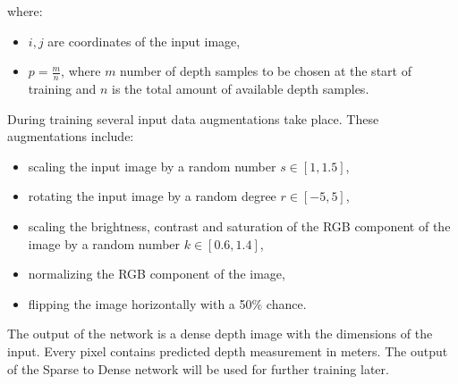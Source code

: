 \documentclass[twoside]{ctuthesis}
\theoremstyle{plain}
\theoremstyle{definition}
\theoremstyle{note}
\begin{document}
where:
\begin{itemize}
	\item $i,j$ are coordinates of the input image,
	\item $p=\frac{m}{n}$, where $m$ number of depth samples to be chosen at the start of training and $n$ is the total amount of available depth samples.
\end{itemize}
During training several input data augmentations take place. These augmentations include:
\begin{itemize}
	\item scaling the input image by a random number $s\in[1,1.5]$,
	\item rotating the input image by a random degree $r\in[-5,5]$,
	\item scaling the brightness, contrast and saturation of the RGB component of the image by a random number $k\in[0.6,1.4]$,
	\item normalizing the RGB component of the image,
	\item flipping the image horizontally with a 50\% chance.
\end{itemize}
The output of the network is a dense depth image with the dimensions of the input. Every pixel contains predicted depth measurement in meters. The output of the Sparse to Dense network will be used for further training later.
\end{document}
